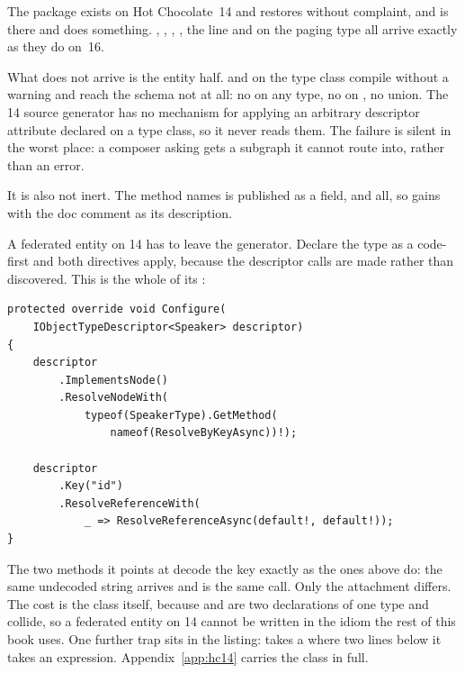 \begin{onhc14}
The package exists on Hot Chocolate~14 and restores without complaint, and
 is there and does something. ,
, , , the  line and
 on the paging type all arrive exactly as they do on~16.

What does not arrive is the entity half. \code{[Key]} and
\code{[ReferenceResolver]} on the type class compile without a warning and
reach the schema not at all: no  on any type, no 
on , no  union. The 14 source generator has no
mechanism for applying an arbitrary descriptor attribute declared on a type
class, so it never reads them. The failure is silent in the worst place: a
composer asking  gets a subgraph it cannot route into, rather
than an error.

It is also not inert. The method \code{[ReferenceResolver]} names is published
as a field, \code{[GraphQLIgnore]} and all, so  gains
 with the doc comment as
its description.

A federated entity on 14 has to leave the generator. Declare the type as a
code-first  and both directives apply, because the
descriptor calls are made rather than discovered. This is the whole of its
:

\begin{verbatim}
protected override void Configure(
    IObjectTypeDescriptor<Speaker> descriptor)
{
    descriptor
        .ImplementsNode()
        .ResolveNodeWith(
            typeof(SpeakerType).GetMethod(
                nameof(ResolveByKeyAsync))!);

    descriptor
        .Key("id")
        .ResolveReferenceWith(
            _ => ResolveReferenceAsync(default!, default!));
}
\end{verbatim}

The two methods it points at decode the key exactly as the ones above do: the
same undecoded string arrives and  is the same call. Only the
attachment differs. The cost is the class itself, because
 and  are two
declarations of one type and collide, so a federated entity on 14 cannot be
written in the idiom the rest of this book uses. One further trap sits in the
listing:  takes a  where
 two lines below it takes an expression.
Appendix~\ref{app:hc14} carries the class in full.
\end{onhc14}
%

